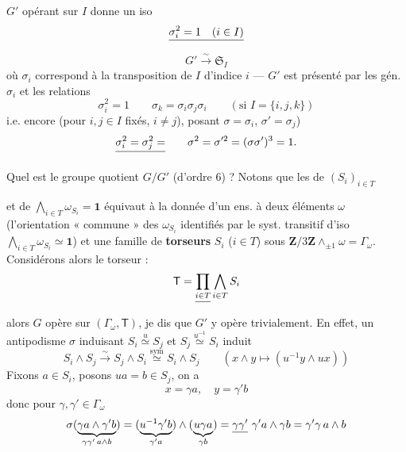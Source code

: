 \documentclass[11pt,a4paper]{article}
\begin{document}
 $G'$ opérant sur
$I$ donne un iso 
\[
  \struck{\sigma_i^2 = 1 \quad (i \in I)}
\]
\[
  G' \xrightarrow{\ \sim\ } \mathfrak{S}_I
\]
où $\sigma_i$ correspond à la transposition de $I$ d'indice $i$ --- $G'$ est
présenté par les gén. $\sigma_i$  et les 
relations
\[
  \sigma_i^2 = 1 \qquad \sigma_k = \sigma_i \sigma_j \sigma_i
  \qquad (\text{si } I = \{i, j, k\})
\]
i.e. encore (pour $i, j \in I$ fixés, $i \neq j$), posant
$\sigma = \sigma_i$, $\sigma' = \sigma_j$)
\[
  \struck{\sigma_i^2 = \sigma_j^2 =} \qquad
  \sigma^2 = \sigma'^2 = (\sigma\sigma')^3 = 1 .
\]

Quel est le groupe quotient $G/G'$ (d'ordre $6$) ? Notons que les
 \struck{\ill{}} de $(S_i)_{i \in T}$


et de $\bigwedge_{i \in T} \omega_{S_i} = \mathbf{1}$ équivaut à la donnée d'un
ens. à deux éléments $\omega$ (l'orientation « commune » des $\omega_{S_i}$
identifiés par le syst. transitif d'iso
$\bigwedge_{i \in T} \omega_{S_i} \simeq \mathbf{1}$) et une famille de
\textbf{torseurs} $S_i$ ($i \in T$) sous
$\mathbf{Z}/3\mathbf{Z} \wedge_{\pm 1} \omega = \Gamma_\omega$.
Considérons alors le \add{$\Gamma_\omega$-}torseur :
\[
  \mathsf{T} = \struck{\prod_{i \in T}} \bigwedge_{i \in T} S_i
\]
alors $G$ opère sur $(\Gamma_\omega, \mathsf{T})$, je dis que $G'$ y opère
trivialement. En effet, un antipodisme $\sigma$ induisant
$S_i \overset{u}{\simeq} S_j$ et $S_j \overset{u^{-1}}{\simeq} S_i$ induit
\[
  S_i \wedge S_j \xrightarrow{\ \sim\ } S_j \wedge S_i
  \overset{\text{sym}}{\simeq} S_i \wedge S_j
  \qquad (x \wedge y \mapsto (u^{-1} y \wedge u x))
\]
 Fixons $a \in S_i$, posons $ua = b \in S_j$, on a
\[
  x = \gamma a, \quad y = \gamma' b
\]
donc pour $\gamma, \gamma' \in \Gamma_\omega$
\[
  \sigma(\underbrace{\gamma a \wedge \gamma' b}_{\gamma\gamma'\, a \wedge b})
  = (\underbrace{u^{-1} \gamma' b}_{\gamma' a}) \wedge (\underbrace{u \gamma a}_{\gamma b})
  = \struck{\gamma\gamma'}\ \gamma' a \wedge \gamma b
  = \underset{}{\gamma'\gamma\, a \wedge b}
\]
\end{document}
